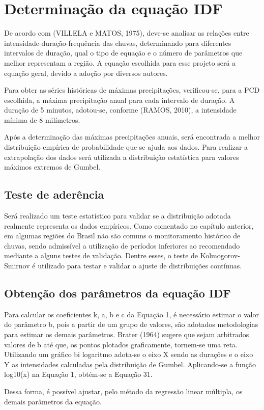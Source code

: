 \section{Determinação da equação IDF}

De acordo com (VILLELA e MATOS, 1975), deve-se analisar as relações entre intensidade-duração-frequência das chuvas, determinando para diferentes intervalos de duração, qual o tipo de equação e o número de parâmetros que melhor representam a região. A equação escolhida para esse projeto será a equação geral, devido a adoção por diversos autores.

Para obter as séries históricas de máximas precipitações, verificou-se, para a PCD escolhida, a máxima precipitação anual para cada intervalo de duração. A duração de 5 minutos, adotou-se, conforme (RAMOS, 2010), a intensidade mínima de 8 milímetros.

Após a determinação das máximas precipitações anuais, será encontrada a melhor distribuição empírica de probabilidade que se ajuda aos dados.
Para realizar a extrapolação dos dados será utilizada a distribuição estatística para valores máximos extremos de Gumbel.

\subsection{Teste de aderência}

Será realizado um teste estatístico para validar se a distribuição adotada realmente representa os dados empíricos. Como comentado no capítulo anterior, em algumas regiões do Brasil não são comuns o monitoramento histórico de chuvas, sendo admissível a utilização de períodos inferiores ao recomendado mediante a alguns testes de validação. Dentre esses, o teste de Kolmogorov-Smirnov é utilizado para testar e validar o ajuste de distribuições contínuas.

\subsection{Obtenção dos parâmetros da equação IDF}

Para calcular os coeficientes k, a, b e c da Equação 1, é necessário estimar o valor do parâmetro b, pois a partir de um grupo de valores, são adotados metodologias para estimar os demais parâmetros. Brater (1964) sugere que sejam arbitrados valores de b até que, os pontos plotados graficamente, tornem-se uma reta. Utilizando um gráfico bi logaritmo adota-se o eixo X sendo as durações e o eixo Y as intensidades calculadas pela distribuição de Gumbel.
Aplicando-se a função log10(x) na Equação 1, obtém-se a Equação 31.

Dessa forma, é possível ajustar, pelo método da regressão linear múltipla, os demais parâmetros da equação.